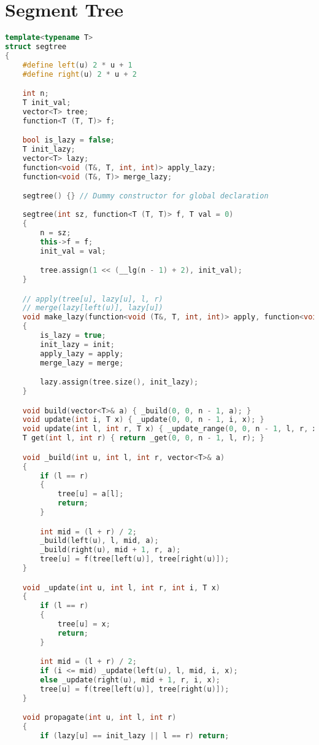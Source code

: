 \section{Segment Tree}
\begin{lstlisting}[language=C++]
template<typename T>
struct segtree
{
    #define left(u) 2 * u + 1
    #define right(u) 2 * u + 2

    int n;
    T init_val;
    vector<T> tree;
    function<T (T, T)> f;

    bool is_lazy = false;
    T init_lazy;
    vector<T> lazy;
    function<void (T&, T, int, int)> apply_lazy;
    function<void (T&, T)> merge_lazy;

    segtree() {} // Dummy constructor for global declaration
    
    segtree(int sz, function<T (T, T)> f, T val = 0)
    {
        n = sz;
        this->f = f;
        init_val = val;

        tree.assign(1 << (__lg(n - 1) + 2), init_val);
    }

    // apply(tree[u], lazy[u], l, r)
    // merge(lazy[left(u)], lazy[u])
    void make_lazy(function<void (T&, T, int, int)> apply, function<void (T&, T)> merge, T init = 0)
    {
        is_lazy = true;
        init_lazy = init;
        apply_lazy = apply;
        merge_lazy = merge;

        lazy.assign(tree.size(), init_lazy);
    }

    void build(vector<T>& a) { _build(0, 0, n - 1, a); }
    void update(int i, T x) { _update(0, 0, n - 1, i, x); }
    void update(int l, int r, T x) { _update_range(0, 0, n - 1, l, r, x); }
    T get(int l, int r) { return _get(0, 0, n - 1, l, r); }

    void _build(int u, int l, int r, vector<T>& a)
    {
        if (l == r)
        {
            tree[u] = a[l];
            return;
        }

        int mid = (l + r) / 2;
        _build(left(u), l, mid, a);
        _build(right(u), mid + 1, r, a);
        tree[u] = f(tree[left(u)], tree[right(u)]);
    }

    void _update(int u, int l, int r, int i, T x)
    {
        if (l == r)
        {
            tree[u] = x;
            return;
        }

        int mid = (l + r) / 2;
        if (i <= mid) _update(left(u), l, mid, i, x);
        else _update(right(u), mid + 1, r, i, x);
        tree[u] = f(tree[left(u)], tree[right(u)]);
    }

    void propagate(int u, int l, int r)
    {
        if (lazy[u] == init_lazy || l == r) return;


\end{lstlisting}
